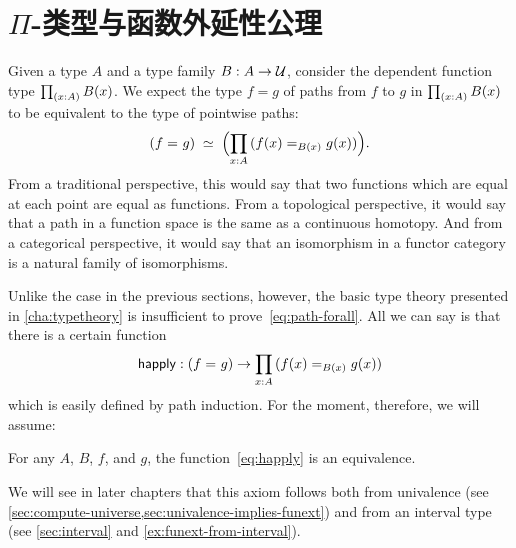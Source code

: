 %

\section{\texorpdfstring{$\Pi$}{Π}-类型与函数外延性公理}
\label{sec:compute-pi}

%
%
%
Given a type $A$ and a type family $B : A \to \mathcal{U}$, consider the dependent function type $\prd{x:A}B(x)$.
We expect the type $f=g$ of paths from $f$ to $g$ in $\prd{x:A} B(x)$ to be equivalent to
the type of pointwise paths:
\begin{equation}
  \eqvspaced{(\id{f}{g})}{\Parens{\prd{x:A} (\id[B(x)]{f(x)}{g(x)})}}.\label{eq:path-forall}
\end{equation}
From a traditional perspective, this would say that two functions which are equal at each point are equal as functions.
%
From a topological perspective, it would say that a path in a function space is the same as a continuous homotopy.
%
And from a categorical perspective, it would say that an isomorphism in a functor category is a natural family of isomorphisms.

Unlike the case in the previous sections, however, the basic type theory presented in \cref{cha:typetheory} is insufficient to prove~\eqref{eq:path-forall}.
All we can say is that there is a certain function
\begin{equation}\label{eq:happly}
  \happly : (\id{f}{g}) \to \prd{x:A} (\id[B(x)]{f(x)}{g(x)})
\end{equation}
which is easily defined by path induction.
For the moment, therefore, we will assume:

\begin{axiom}\label{axiom:funext}
  For any $A$, $B$, $f$, and $g$, the function~\eqref{eq:happly} is an equivalence.
\end{axiom}

We will see in later chapters that this axiom follows both from univalence (see \cref{sec:compute-universe,sec:univalence-implies-funext}) and from an interval type (see \cref{sec:interval} and \cref{ex:funext-from-interval}).

